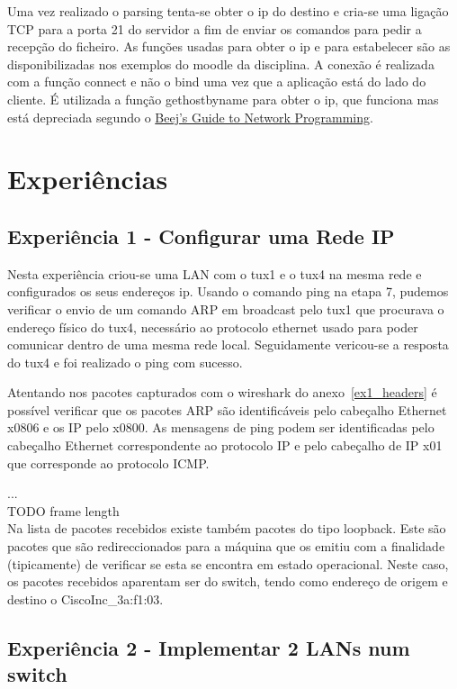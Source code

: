 \documentclass[11pt,a4paper,reqno]{report}
\numberwithin{equation}{section}
\begin{document}
Uma vez realizado o parsing tenta-se obter o ip do destino e cria-se uma ligação TCP para a porta 21 do servidor a fim de enviar os comandos para pedir a recepção do ficheiro. As funções usadas para obter o ip e para estabelecer são as disponibilizadas nos exemplos do moodle da disciplina. A conexão é realizada com a função connect e não o bind uma vez que a aplicação está do lado do cliente. É utilizada a função gethostbyname para obter o ip, que funciona mas está depreciada segundo o \href{ http://beej.us/guide/bgnet/output/html/multipage/index.html}{Beej's Guide to Network Programming}.


\chapter{Experiências}

\section{Experiência 1 - Configurar uma Rede IP}

Nesta experiência criou-se uma LAN com o tux1 e o tux4 na mesma rede e configurados os seus endereços ip. Usando o comando ping na etapa 7, pudemos verificar o envio de um comando ARP em broadcast pelo tux1 que procurava o endereço físico do tux4, necessário ao protocolo ethernet usado para poder comunicar dentro de uma mesma rede local. Seguidamente vericou-se a resposta do tux4 e foi realizado o ping com sucesso.

Atentando nos pacotes capturados com o wireshark do anexo~\ref{ex1_headers} é possível verificar que os pacotes ARP são identificáveis pelo cabeçalho Ethernet x0806 e os IP pelo x0800. As mensagens de ping podem ser identificadas pelo cabeçalho Ethernet correspondente ao protocolo IP e pelo cabeçalho de IP x01 que corresponde ao protocolo ICMP.

...\\ TODO frame length \\

Na lista de pacotes recebidos existe também pacotes do tipo loopback. Este são pacotes que são redireccionados para a máquina que os emitiu com a finalidade (tipicamente) de verificar se esta se encontra em estado operacional. Neste caso, os pacotes recebidos aparentam ser do switch, tendo como endereço de origem e destino o CiscoInc\_3a:f1:03.

\section{Experiência 2 - Implementar 2 LANs num switch}
\end{document}
